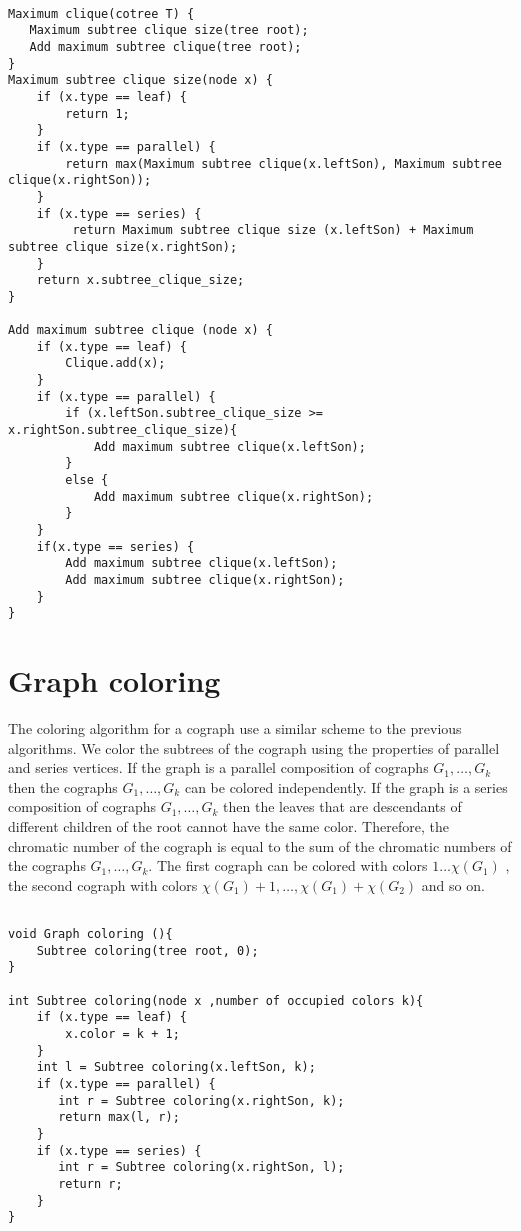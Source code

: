\begin{verbatim}

Maximum clique(cotree T) {
   Maximum subtree clique size(tree root);
   Add maximum subtree clique(tree root);
}
Maximum subtree clique size(node x) {
    if (x.type == leaf) {
        return 1;
    }
    if (x.type == parallel) {
        return max(Maximum subtree clique(x.leftSon), Maximum subtree clique(x.rightSon));
    }
    if (x.type == series) {
         return Maximum subtree clique size (x.leftSon) + Maximum subtree clique size(x.rightSon);
    }
    return x.subtree_clique_size;
}

Add maximum subtree clique (node x) {
    if (x.type == leaf) {
        Clique.add(x);
    }
    if (x.type == parallel) {
        if (x.leftSon.subtree_clique_size >= x.rightSon.subtree_clique_size){
            Add maximum subtree clique(x.leftSon);
        }
        else {
            Add maximum subtree clique(x.rightSon);
        }
    }
    if(x.type == series) {
        Add maximum subtree clique(x.leftSon);
        Add maximum subtree clique(x.rightSon);
    }
}

\end{verbatim}

\section{Graph coloring}
The coloring algorithm for a cograph use a similar scheme to the previous algorithms. We color the subtrees of the cograph using the properties of parallel and series vertices. If the graph is a parallel composition of cographs $G_1, \dots , G_k$ then the cographs $G_1, \dots ,G_k$ can be colored independently. If the graph is a series composition of cographs $G_1, \dots , G_k$ then the leaves that are descendants of different children of the root cannot have the same color. Therefore, the chromatic number of the cograph is equal to the sum of the chromatic numbers of the cographs $G_1, \dots ,G_k$. The first cograph can be colored with colors $1 \dots \chi(G_1)$ , the second cograph with colors $\chi(G_1)+1, \dots, \chi(G_1)+\chi(G_2)$ and so on.

\begin{verbatim}

void Graph coloring (){
    Subtree coloring(tree root, 0);
}

int Subtree coloring(node x ,number of occupied colors k){
    if (x.type == leaf) {
        x.color = k + 1;
    }
    int l = Subtree coloring(x.leftSon, k);
    if (x.type == parallel) {
       int r = Subtree coloring(x.rightSon, k);
       return max(l, r);
    }
    if (x.type == series) {
       int r = Subtree coloring(x.rightSon, l);
       return r;
    }
}
\end{verbatim}
\label{Max}
